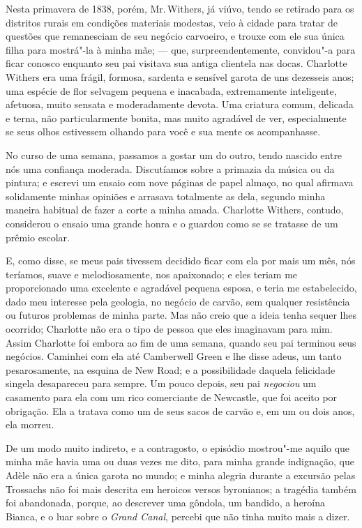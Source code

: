 Nesta primavera de 1838, porém, Mr.\,Withers, já viúvo, tendo se retirado
para os distritos rurais em condições materiais modestas, veio à cidade
para tratar de questões que remanesciam de seu negócio carvoeiro, e
trouxe com ele sua única filha para mostrá"-la à minha mãe; --- que,
surpreendentemente, convidou"-a para ficar conosco enquanto seu pai
visitava sua antiga clientela nas docas. Charlotte Withers era uma
frágil, formosa, sardenta e sensível garota de uns dezesseis anos; uma
espécie de flor selvagem pequena e inacabada, extremamente inteligente,
afetuosa, muito sensata e moderadamente devota. Uma criatura comum,
delicada e terna, não particularmente bonita, mas muito agradável de
ver, especialmente se seus olhos estivessem olhando para você e sua
mente os acompanhasse.

No curso de uma semana, passamos a gostar um do outro, tendo
nascido entre nós uma confiança moderada. Discutíamos sobre a primazia
da música ou da pintura; e escrevi um ensaio com nove páginas de papel
almaço, no qual afirmava solidamente minhas opiniões e arrasava
totalmente as dela, segundo minha maneira habitual de fazer a corte a
minha amada. Charlotte Withers, contudo, considerou o ensaio uma grande
honra e o guardou como se se tratasse de um prêmio escolar.

E, como disse, se meus pais tivessem decidido ficar com ela por mais um
mês, nós teríamos, suave e melodiosamente, nos apaixonado; e eles teriam
me proporcionado uma excelente e agradável pequena esposa, e teria me
estabelecido, dado meu interesse pela geologia, no negócio de carvão,
sem qualquer resistência ou futuros problemas de minha parte. Mas não
creio que a ideia tenha sequer lhes ocorrido; Charlotte não era o tipo
de pessoa que eles imaginavam para mim. Assim Charlotte foi embora ao
fim de uma semana, quando seu pai terminou seus negócios. Caminhei com
ela até Camberwell Green e lhe disse adeus, um tanto pesarosamente, na
esquina de New Road; e a possibilidade daquela felicidade singela
desapareceu para sempre. Um pouco depois, seu pai \textit{negociou} um
casamento para ela com um rico comerciante de Newcastle, que foi aceito
por obrigação. Ela a tratava como um de seus sacos de carvão e, em um ou
dois anos, ela morreu.

De um modo muito indireto, e a contragosto, o episódio mostrou"-me
aquilo que minha mãe havia uma ou duas vezes me dito, para minha grande
indignação, que Adèle não era a única garota no mundo; e minha alegria
durante a excursão pelas Trossachs não foi mais descrita em heroicos
versos byronianos; a tragédia também foi abandonada, porque, ao
descrever uma gôndola, um bandido, a heroína Bianca, e o luar sobre o
\textit{Grand Canal}, percebi que não tinha muito mais a dizer.

